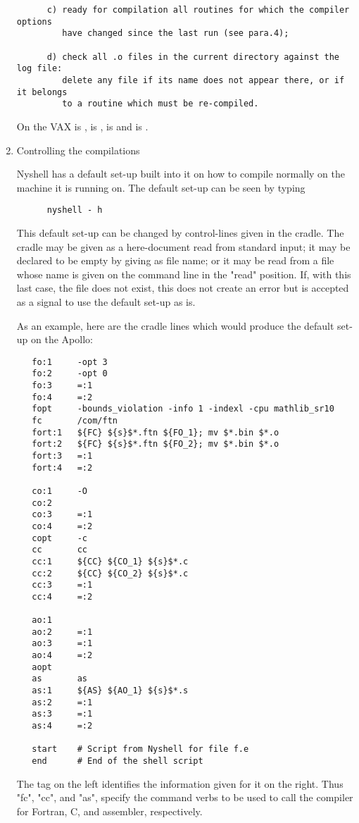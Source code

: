 \begin{enumerate}
\begin{verbatim}
      c) ready for compilation all routines for which the compiler options
         have changed since the last run (see para.4);

      d) check all .o files in the current directory against the log file:
         delete any file if its name does not appear there, or if it belongs
         to a routine which must be re-compiled.
\end{verbatim}
On the VAX   is ,  is ,
 is  and  is .

\item
Controlling the compilations

Nyshell has a default set-up built into it on how to compile normally on the
machine it is running on. The default set-up can be seen by typing
\begin{verbatim}
      nyshell - h
\end{verbatim}
This default set-up can be changed by control-lines given in the cradle.
The cradle may be given as a here-document read from standard input;
it may be declared to be empty by giving  as file name; or it may be
read from a file whose name is given on the command line in the "read"
position. If, with this last case, the file does not exist, this does
not create an error but is accepted as a signal to use the default
set-up as is.

As an example, here are the cradle lines which would produce the
default set-up on the Apollo:
\begin{verbatim}
   fo:1     -opt 3
   fo:2     -opt 0
   fo:3     =:1
   fo:4     =:2
   fopt     -bounds_violation -info 1 -indexl -cpu mathlib_sr10
   fc       /com/ftn
   fort:1   ${FC} ${s}$*.ftn ${FO_1}; mv $*.bin $*.o
   fort:2   ${FC} ${s}$*.ftn ${FO_2}; mv $*.bin $*.o
   fort:3   =:1
   fort:4   =:2

   co:1     -O
   co:2
   co:3     =:1
   co:4     =:2
   copt     -c
   cc       cc
   cc:1     ${CC} ${CO_1} ${s}$*.c
   cc:2     ${CC} ${CO_2} ${s}$*.c
   cc:3     =:1
   cc:4     =:2

   ao:1
   ao:2     =:1
   ao:3     =:1
   ao:4     =:2
   aopt
   as       as
   as:1     ${AS} ${AO_1} ${s}$*.s
   as:2     =:1
   as:3     =:1
   as:4     =:2

   start    # Script from Nyshell for file f.e
   end      # End of the shell script
\end{verbatim}

The tag on the left identifies the information given for it on the right.
Thus "fc", "cc", and "as", specify the command verbs to be used to call
the compiler for Fortran, C, and assembler, respectively.


\end{enumerate}
